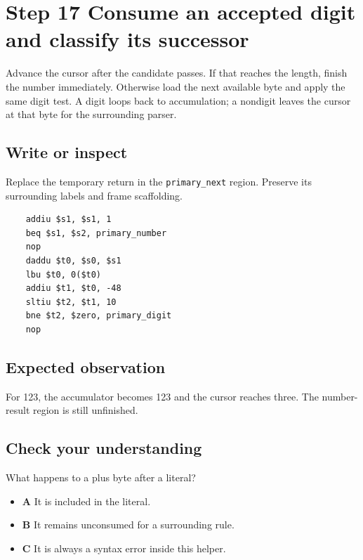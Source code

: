 \section{Step 17 Consume an accepted digit and classify its successor}\label{expression-s17}

Advance the cursor after the candidate passes. If that reaches the length, finish the number immediately. Otherwise load the next available byte and apply the same digit test. A digit loops back to accumulation; a nondigit leaves the cursor at that byte for the surrounding parser.

\subsection{Write or inspect}
Replace the temporary return in the \texttt{primary\_next} region. Preserve its surrounding labels and frame scaffolding.

\begin{verbatim}
    addiu $s1, $s1, 1
    beq $s1, $s2, primary_number
    nop
    daddu $t0, $s0, $s1
    lbu $t0, 0($t0)
    addiu $t1, $t0, -48
    sltiu $t2, $t1, 10
    bne $t2, $zero, primary_digit
    nop
\end{verbatim}
\subsection{Expected observation}
For 123, the accumulator becomes 123 and the cursor reaches three. The number-result region is still unfinished.

\subsection{Check your understanding}
What happens to a plus byte after a literal?

\begin{itemize}
  \item \textbf{A} It is included in the literal.
  \item \textbf{B} It remains unconsumed for a surrounding rule.
  \item \textbf{C} It is always a syntax error inside this helper.
\end{itemize}
